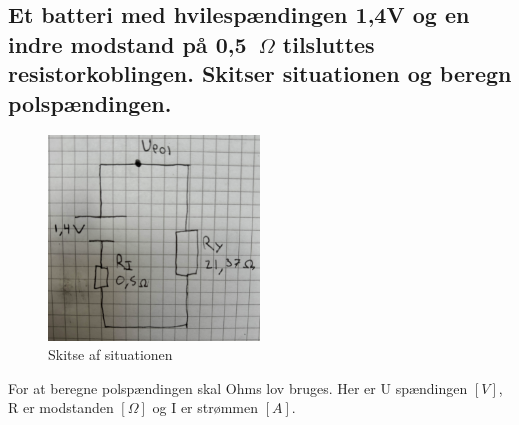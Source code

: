 \subsection{Et batteri med hvilespændingen 1,4V og en indre modstand på 0,5~$\Omega$ tilsluttes resistorkoblingen. Skitser situationen og beregn polspændingen.}
\begin{figure}[h!]
    \centering
    \includegraphics[width=0.5\textwidth]{figures/ellareskitse.png}
    \caption{Skitse af situationen}
\end{figure}
For at beregne polspændingen skal Ohms lov bruges. Her er U spændingen $[V]$, R er modstanden $[\Omega]$ og I er strømmen $[A]$.


